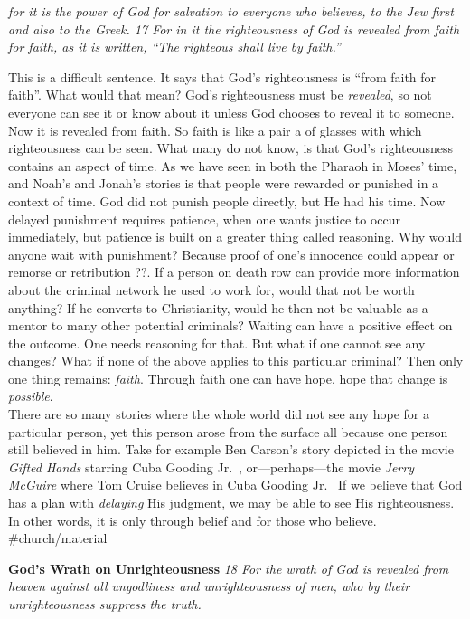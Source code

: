 \emph{for it is the power of God for salvation to everyone who believes,
to the Jew first and also to the Greek. 17 For in it the righteousness
of God is revealed from faith for faith, as it is written, ``The
righteous shall live by faith.''}

This is a difficult sentence. It says that God's righteousness is ``from
faith for faith''. What would that mean? God's righteousness must be
\emph{revealed}, so not everyone can see it or know about it unless God
chooses to reveal it to someone. Now it is revealed from faith. So faith
is like a pair a of glasses with which righteousness can be seen. What
many do not know, is that God's righteousness contains an aspect of
time. As we have seen in both the Pharaoh in Moses' time, and Noah's and
Jonah's stories is that people were rewarded or punished in a context of
time. God did not punish people directly, but He had his time. Now
delayed punishment requires patience, when one wants justice to occur
immediately, but patience is built on a greater thing called reasoning.
Why would anyone wait with punishment? Because proof of one's innocence
could appear or remorse or retribution ??. If a person on death row can
provide more information about the criminal network he used to work for,
would that not be worth anything? If he converts to Christianity, would
he then not be valuable as a mentor to many other potential criminals?
Waiting can have a positive effect on the outcome. One needs reasoning
for that. But what if one cannot see any changes? What if none of the
above applies to this particular criminal? Then only one thing remains:
\emph{faith}. Through faith one can have hope, hope that change is
\emph{possible}.\\
There are so many stories where the whole world did not see any hope for
a particular person, yet this person arose from the surface all because
one person still believed in him. Take for example Ben Carson's story
depicted in the movie \emph{Gifted Hands} starring Cuba Gooding Jr.~,
or---perhaps---the movie \emph{Jerry McGuire} where Tom Cruise believes
in Cuba Gooding Jr.~ If we believe that God has a plan with
\emph{delaying} His judgment, we may be able to see His righteousness.
In other words, it is only through belief and for those who believe.
\#church/material

\textbf{God's Wrath on Unrighteousness} \emph{18 For the wrath of God is
revealed from heaven against all ungodliness and unrighteousness of men,
who by their unrighteousness suppress the truth.}

